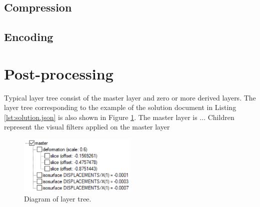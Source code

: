 
\subsection {Compression}


\subsection {Encoding}
\label{subsec:encoding}

\section{Post-processing}
\label{sec:postprocessing}

Typical layer tree consist of the master layer and zero or more derived layers. The layer tree corresponding to the example of the solution document in Listing \ref{lst:solution.json} is also shown in Figure \ref{fig:layers-tree}. The master layer is ... Children represent the visual filters applied on the master layer

\begin{figure}[H]
    \centering
    \includegraphics[width=0.5\textwidth]{figures/chapter-data-management/layers-tree-diagram}
    \decoRule
    \caption{Diagram of layer tree.}
    \label{fig:layers-tree}
\end{figure}


